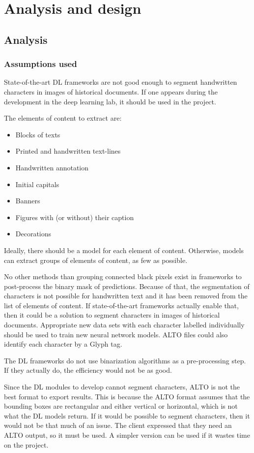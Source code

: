 \documentclass{polytech/polytech}
\numberwithin{figure}{chapter}
\begin{document}
\chapter{Analysis and design}

\section{Analysis}


\subsection{Assumptions used}

State-of-the-art DL frameworks are not good enough to segment handwritten characters in images of historical documents.
If one appears during the development in the deep learning lab, it should be used in the project.

The elements of content to extract are:
\begin{itemize}
\item Blocks of texts
\item Printed and handwritten text-lines
\item Handwritten annotation
\item Initial capitals
\item Banners
\item Figures with (or without) their caption
\item Decorations
\end{itemize}
Ideally, there should be a model for each element of content.
Otherwise, models can extract groups of elements of content, as few as possible.

No other methods than grouping connected black pixels exist in frameworks to post-process the binary mask of predictions.
Because of that, the segmentation of characters is not possible for handwritten text and it has been removed from the list of elements of content.
If state-of-the-art frameworks actually enable that, then it could be a solution to segment characters in images of historical documents.
Appropriate new data sets with each character labelled individually should be used to train new neural network models.
ALTO files could also identify each character by a Glyph tag.

The DL frameworks do not use binarization algorithms as a pre-processing step.
If they actually do, the efficiency would not be as good.

Since the DL modules to develop cannot segment characters, ALTO is not the best format to export results.
This is because the ALTO format assumes that the bounding boxes are rectangular and either vertical or horizontal, which is not what the DL models return.
If it would be possible to segment characters, then it would not be that much of an issue.
The client expressed that they need an ALTO output, so it must be used.
A simpler version can be used if it wastes time on the project.
\end{document}
